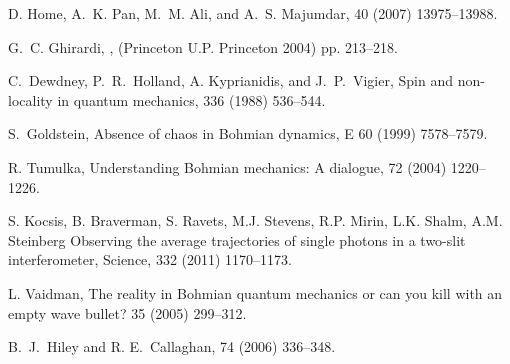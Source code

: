 \documentclass[preprint,tightenlines]{elsarticle}
\begin{document}
\begin{thebibliography}{40}
D. Home, A.~K. Pan, M.~M. Ali, and A.~S. Majumdar,
  40 (2007) 13975--13988.

G.~C. Ghirardi,
,
\newblock (Princeton U.P. Princeton 2004) pp. 213--218.

C.~Dewdney, P.~R.~Holland,  A. Kyprianidis, and J.~P.~Vigier,
\newblock Spin and non-locality in quantum mechanics,
  336 (1988) 536--544.

S.~Goldstein,
\newblock Absence of chaos in Bohmian dynamics,
  E 60  (1999) 7578--7579.

R. Tumulka,
\newblock Understanding Bohmian mechanics: A dialogue,
 72 (2004) 1220--1226.

S. Kocsis, B. Braverman, S. Ravets, M.J. Stevens, R.P. Mirin, L.K. Shalm, A.M. Steinberg
\newblock Observing the average trajectories of single photons in a two-slit interferometer,
\newblock
Science, 332  (2011) 1170--1173.

L. Vaidman,
\newblock The reality in Bohmian quantum mechanics or can you kill with an
  empty wave bullet?
  35 (2005) 299--312.

B.~J.~Hiley and R. E.~Callaghan,
  74 (2006) 336--348.
\end{thebibliography}
\end{document}
